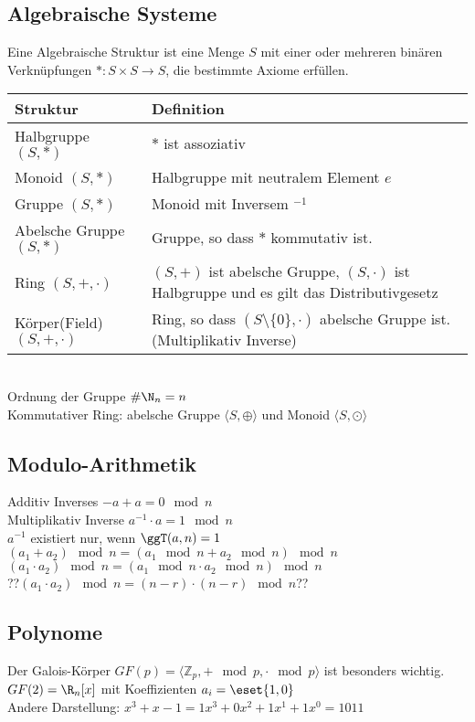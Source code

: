 \documentclass[fs]{latex4ei}
\begin{document}
\begin{multicols}{4}
	\subsection{Algebraische Systeme}
	Eine Algebraische Struktur ist eine Menge $S$ mit einer oder mehreren binären Verknüpfungen $*:S\times S \rightarrow S$, die bestimmte Axiome erfüllen.\\
	\begin{tabular}{l|p{3.5cm}}
		Struktur & Definition \\ \hline
		Halbgruppe $(S,*)$ & $*$ ist assoziativ \\
		Monoid $(S,*)$ & Halbgruppe mit neutralem Element $e$\\
		Gruppe $(S,*)$ & Monoid mit Inversem $^{-1}$\\
		Abelsche Gruppe $(S,*)$ & Gruppe, so dass $*$ kommutativ ist.\\
		Ring $(S,+,\cdot)$ & $(S,+)$ ist abelsche Gruppe, $(S,\cdot)$ ist Halbgruppe 
			und es gilt das Distributivgesetz \\
		Körper(Field) $(S,+,\cdot)$ & Ring, so dass $(S\setminus\{ 0 \}, \cdot)$ abelsche Gruppe ist. (Multiplikativ Inverse)\\
	\end{tabular}\\
	Ordnung der Gruppe $\# \N_n = n$\\
	
	Kommutativer Ring: 
	abelsche Gruppe $\langle S,\oplus \rangle$
	und Monoid $\langle S,\odot \rangle$
	
	\subsection{Modulo-Arithmetik}
	Additiv Inverses $-a + a = 0 \mod n$\\
	Multiplikativ Inverse $a^{-1} \cdot a = 1 \mod n$\\ 
	$a^{-1}$ existiert nur, wenn $\ggT(a,n) = 1$\\

	$(a_1 + a_2) \mod n = ( a_1 \mod n + a_2 \mod n) \mod n$\\
	$(a_1 \cdot a_2) \mod n = ( a_1 \mod n \cdot a_2 \mod n) \mod n$\\
	??$(a_1 \cdot a_2) \mod n = (n-r) \cdot (n-r) \mod n$??

	\subsection{Polynome}
	Der Galois-Körper $GF(p) = \langle \mathbb Z_p, + \mod p, \cdot \mod p \rangle$ ist besonders wichtig.\\
	$GF(2) = \R_n[x]$ mit Koeffizienten $a_i = \eset{1,0}$\\
	Andere Darstellung: $x^3 + x - 1 = 1 x^3 + 0 x^2 + 1x^1 + 1x^0 = 1011$\\
	

\end{multicols}
\end{document}
